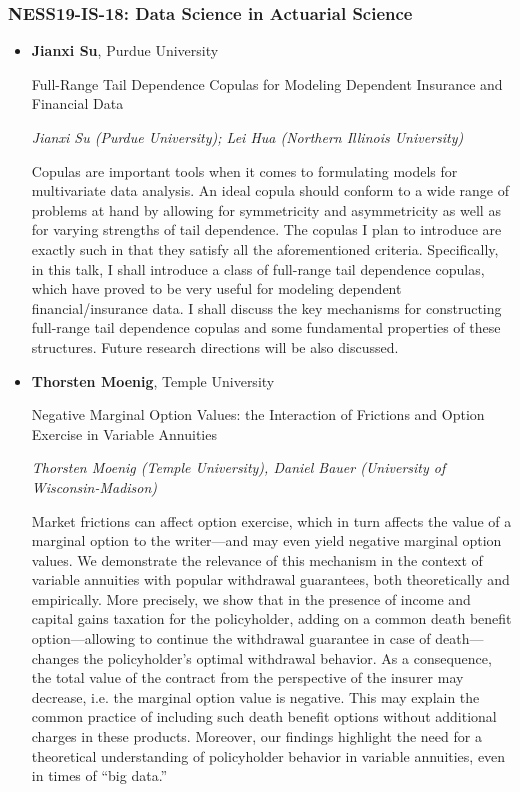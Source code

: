 \subsubsection*{NESS19-IS-18: Data Science in Actuarial Science}

\begin{itemize}
\item \textbf{Jianxi Su}, Purdue University

Full-Range Tail Dependence Copulas for Modeling Dependent Insurance and Financial Data

\emph{\footnotesize Jianxi Su (Purdue University); Lei Hua (Northern Illinois University)}

Copulas are important tools when it comes to formulating models for multivariate data analysis.  An ideal copula should conform to a wide range of problems at hand by allowing for symmetricity and asymmetricity as well as for varying strengths of tail dependence. The copulas I plan to introduce are exactly such in that they satisfy all the aforementioned criteria. Specifically, in this talk, I shall introduce a class of full-range tail dependence copulas, which have proved to be very useful for modeling dependent financial/insurance data. I shall discuss the key mechanisms for constructing full-range tail dependence copulas and some fundamental properties of these structures.  Future research directions will be also discussed. 


\item \textbf{Thorsten Moenig}, Temple University

Negative Marginal Option Values:  the Interaction of Frictions and Option Exercise in Variable Annuities

\emph{\footnotesize Thorsten Moenig (Temple University), Daniel Bauer (University of Wisconsin-Madison)}

Market frictions can affect option exercise, which in turn affects the value of a marginal option to the writer---and may even yield negative marginal option values.  We demonstrate the relevance of this mechanism in the context of variable annuities with popular withdrawal guarantees, both theoretically and empirically.  More precisely, we show that in the presence of income and capital gains taxation for the policyholder, adding on a common death benefit option---allowing to continue the withdrawal guarantee in case of death---changes the policyholder's optimal withdrawal behavior.  As a consequence, the total value of the contract from the perspective of the insurer may decrease, i.e. the marginal option value is negative.  This may explain the common practice of including such death benefit options without additional charges in these products.  Moreover, our findings highlight the need for a theoretical understanding of policyholder behavior in variable annuities, even in times of ``big data.''


\end{itemize}
